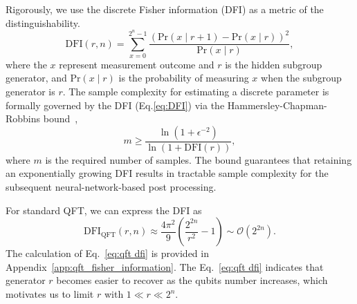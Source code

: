 \documentclass[reprint, aps, prl, superscriptaddress]{revtex4-2}
\newcommand{\myqc}{\text{HP}}
\newcommand{\fii}{\mathrm{DFI}}
\begin{document}
Rigorously, we use the discrete Fisher information (DFI) as a metric of the distinguishability.
\begin{equation}
\label{eq:DFI}
    \fii(r, n) = \sum_{x = 0}^{2^n -1} \frac{\left(\text{Pr}(x\mid r+1) - \text{Pr}(x\mid r)\right)^2}{\text{Pr}(x\mid r)},
\end{equation}
where the $x$ represent measurement outcome and $r$ is the hidden subgroup generator, and $\text{Pr}(x\mid r)$ is the probability of measuring $x$ when the subgroup generator is $r$. The sample complexity for estimating a discrete parameter is formally governed by the DFI (Eq.\eqref{eq:DFI}) via the Hammersley-Chapman-Robbins bound~\cite{chapman1951minimum, hammersley1950estimating}, 
\begin{equation}
    m \ge \frac{\ln\left( 1 + \epsilon^{-2} \right)}{\ln\left( 1 + \fii(r) \right)},
\end{equation}
where $m$ is the required number of samples. The bound guarantees that retaining an exponentially growing DFI results in tractable sample complexity for the subsequent neural-network-based post processing. 


For standard QFT, we can express the DFI as
\begin{equation}
\label{eq:qft dfi}
    \fii_{\mathrm{QFT}}(r,n) \approx \frac{4\pi^2}{9}\left(\frac{2^{2n}}{r^2}-1\right) \sim \mathcal{O}\left(2^{2n}\right).
\end{equation}
The calculation of Eq.~\eqref{eq:qft dfi} is provided in Appendix~\ref{app:qft_fisher_information}. 
The Eq.~\eqref{eq:qft dfi} indicates that generator $r$ becomes easier to recover as the qubits number increases, which motivates us to limit $r$ with $1 \ll r \ll 2^n$. 

\end{document}
